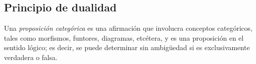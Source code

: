 \documentclass[tesis]{subfiles}
\begin{document}
\subsection*{Principio de dualidad} \label{Ssec: Principio de dualidad}

\begin{Def}\label{Def: Proposición categórica}
    Una \emph{proposición categórica} es una afirmación que involucra conceptos categóricos, tales como morfismos, funtores, diagramas, etcétera, y es una proposición en el sentido lógico; es decir, se puede determinar sin ambigüedad si es exclusivamente verdadera o falsa.
\end{Def}

%
%    
%
%
%

\end{document}
